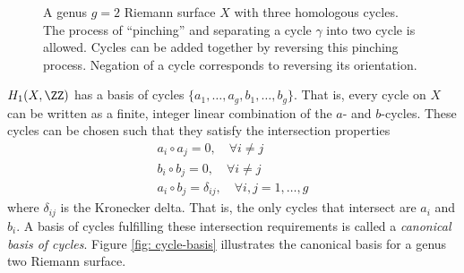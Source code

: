 \begin{figure}
  \caption{A genus $g=2$ Riemann surface $X$ with three homologous
    cycles. The process of ``pinching'' and separating a cycle $\gamma$
    into two cycle is allowed. Cycles can be added together by reversing
    this pinching process. Negation of a cycle corresponds to reversing
    its orientation.}
  \label{fig: pinching}
\end{figure}

$H_1(X,\ZZ)$ has a basis of cycles
$\{a_1,\ldots,a_g,b_1,\ldots,b_g\}$. That is, every cycle on $X$ can be
written as a finite, integer linear combination of the $a$- and
$b$-cycles. These cycles can be chosen such that they satisfy the
intersection properties
\begin{gather*}
  a_i \circ a_j = 0, \quad \forall i \neq j \\
  b_i \circ b_j = 0, \quad \forall i \neq j \\
  a_i \circ b_j = \delta_{ij}, \quad \forall i,j = 1, \ldots, g
\end{gather*}
where $\delta_{ij}$ is the Kronecker delta. That is, the only cycles
that intersect are $a_i$ and $b_i$. A basis of cycles fulfilling these
intersection requirements is called a {\it canonical basis of
  cycles}. Figure \ref{fig: cycle-basis} illustrates the canonical basis
for a genus two Riemann surface.

